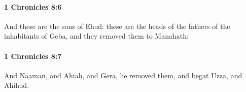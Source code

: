 		\paragraph{1 Chronicles 8:6} %
			\label{1CHRONICLES-8-6}

			And these are the sons of Ehud: these are the heads of the fathers of the inhabitants of Geba, and they removed them to Manahath:


		\paragraph{1 Chronicles 8:7} %
			\label{1CHRONICLES-8-7}

			And Naaman, and Ahiah, and Gera, he removed them, and begat Uzza, and Ahihud.


